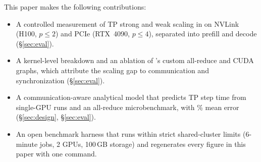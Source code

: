 This paper makes the following contributions:
\begin{itemize}
  \item A controlled measurement of TP strong and weak scaling in \vllm on NVLink (H100,
        $p\le2$) and PCIe (RTX~4090, $p\le4$), separated into prefill and decode
        (\S\ref{sec:eval}).
  \item A kernel-level breakdown and an ablation of \vllm's custom all-reduce and CUDA
        graphs, which attribute the scaling gap to communication and synchronization
        (\S\ref{sec:eval}).
  \item A communication-aware analytical model that predicts TP step time from
        single-GPU runs and an all-reduce microbenchmark, with \tbd\% mean error
        (\S\ref{sec:design}, \S\ref{sec:eval}).
  \item An open benchmark harness that runs within strict shared-cluster limits
        (6-minute jobs, 2 GPUs, 100\,GB storage) and regenerates every figure in this
        paper with one command.
\end{itemize}

